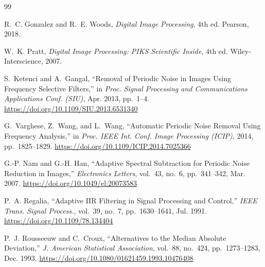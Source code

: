 \documentclass[conference,a4paper]{IEEEtran}
\begin{document}
\begin{thebibliography}{99}

R.~C. Gonzalez and R.~E. Woods, \textit{Digital Image Processing}, 4th ed. Pearson, 2018.

W.~K. Pratt, \textit{Digital Image Processing: PIKS Scientific Inside}, 4th ed. Wiley-Interscience, 2007.

S.~Ketenci and A.~Gangal, ``Removal of Periodic Noise in Images Using Frequency Selective Filters,'' in \textit{Proc. Signal Processing and Communications Applications Conf. (SIU)}, Apr. 2013, pp.~1--4. \url{https://doi.org/10.1109/SIU.2013.6531340}

G.~Varghese, Z.~Wang, and L.~Wang, ``Automatic Periodic Noise Removal Using Frequency Analysis,'' in \textit{Proc. IEEE Int. Conf. Image Processing (ICIP)}, 2014, pp.~1825--1829. \url{https://doi.org/10.1109/ICIP.2014.7025366}

G.-P. Nam and G.-H. Han, ``Adaptive Spectral Subtraction for Periodic Noise Reduction in Images,'' \textit{Electronics Letters}, vol.~43, no.~6, pp.~341--342, Mar. 2007. \url{https://doi.org/10.1049/el:20073583}

P.~A. Regalia, ``Adaptive IIR Filtering in Signal Processing and Control,'' \textit{IEEE Trans. Signal Process.}, vol.~39, no.~7, pp.~1630--1641, Jul. 1991. \url{https://doi.org/10.1109/78.134404}

P.~J. Rousseeuw and C.~Croux, ``Alternatives to the Median Absolute Deviation,'' \textit{J. American Statistical Association}, vol.~88, no.~424, pp.~1273--1283, Dec. 1993. \url{https://doi.org/10.1080/01621459.1993.10476408}

\end{thebibliography}
\end{document}
